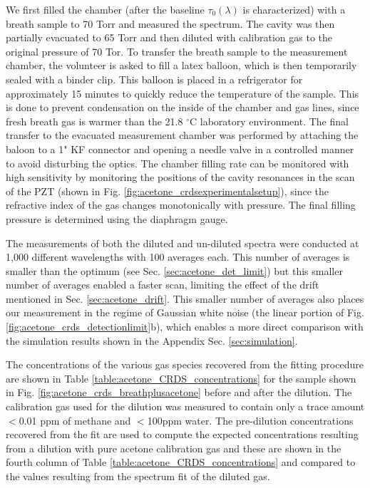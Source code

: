 \documentclass[8pt,a4paper]{report}
\begin{document}
	We first filled the chamber (after the baseline $\tau_0(\lambda)$ is characterized) with a breath sample to 70 Torr and measured the spectrum. The cavity was then partially evacuated to 65 Torr and then diluted with calibration gas to the original pressure of 70 Tor. To transfer the breath sample to the measurement chamber, the volunteer is asked to fill a latex balloon, which is then temporarily sealed with a binder clip. This balloon is placed in a refrigerator for approximately 15 minutes to quickly reduce the temperature of the sample. This is done to prevent condensation on the inside of the chamber and gas lines, since fresh breath gas is warmer than the 21.8 $^\circ$C laboratory environment. The final transfer to the evacuated measurement chamber was performed by attaching the baloon to a 1" KF connector and opening a needle valve in a controlled manner to avoid disturbing the optics. The chamber filling rate can be monitored with high sensitivity by monitoring the positions of the cavity resonances in the scan of the PZT (shown in Fig. \ref{fig:acetone_crdsexperimentalsetup}), since the refractive index of the gas changes monotonically with pressure. The final filling pressure is determined using the diaphragm gauge.
	
	The measurements of both the diluted and un-diluted spectra were conducted at 1,000 different wavelengths with 100 averages each. This number of averages is smaller than the optimum (see Sec. \ref{sec:acetone_det_limit}) but this smaller number of averages enabled a faster scan, limiting the effect of the drift mentioned in Sec. \ref{sec:acetone_drift}. This smaller number of averages also places our measurement in the regime of Gaussian white noise (the linear portion of Fig. \ref{fig:acetone_crds_detectionlimit}b), which enables a more direct comparison with the simulation results shown in the Appendix Sec. \ref{sec:simulation}.
	
	The concentrations of the various gas species recovered from the fitting procedure are shown in Table \ref{table:acetone_CRDS_concentrations} for the sample shown in Fig. \ref{fig:acetone_crds_breathplusacetone} before and after the dilution. The calibration gas used for the dilution was measured to contain only a trace amount $<$0.01 ppm of methane and $<$100ppm water. The pre-dilution concentrations recovered from the fit are used to compute the expected concentrations resulting from a dilution with pure acetone calibration gas and these are shown in the fourth column of Table \ref{table:acetone_CRDS_concentrations} and compared to the values resulting from the spectrum fit of the diluted gas.
	
\end{document}
